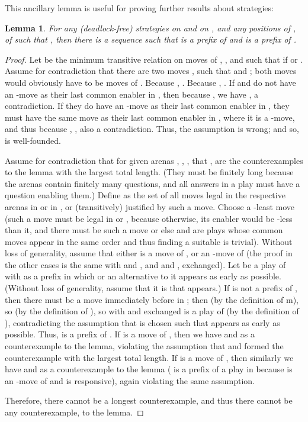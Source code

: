 \documentclass{article}
\newtheorem{lemma}[theorem]{Lemma}
\begin{document}
This ancillary lemma is useful for proving further results about strategies:
\begin{lemma}\label{lem:stratprefix}
  For any (deadlock-free) strategies  on  and  on , and any positions  of ,  of  such that ,  then there is a sequence  such that  is a prefix of  and  is a prefix of .
\end{lemma}
\begin{proof}
  Let  be the minimum transitive relation on moves of , , and  such that  if  or . Assume for contradiction that there are two moves ,  such that  and ; both moves would obviously have to be moves of . Because , . Because , . If  and  do not have an -move as their last common enabler in , then because , we have , a contradiction. If they do have an -move as their last common enabler in , they must have the same move as their last common enabler in , where it is a -move, and thus because , , also a contradiction. Thus, the assumption is wrong; and so,  is well-founded.

  Assume for contradiction that for given arenas , , , that ,  are the counterexamples to the lemma with the largest total length. (They must be finitely long because the arenas contain finitely many questions, and all answers in a play must have a question enabling them.) Define  as the set of all moves legal in the respective arenas in  or in , or (transitively) justified by such a move. Choose a -least move  (such a move must be legal in  or , because otherwise, its enabler would be -less than it, and there must be such a move or else  and  are plays whose common moves appear in the same order and thus finding a suitable  is trivial). Without loss of generality, assume that either  is a move of , or an -move of  (the proof in the other cases is the same with  and , and  and , exchanged). Let  be a play of  with  as a prefix in which  or an alternative to it appears as early as possible. (Without loss of generality, assume that it is  that appears.) If  is not a prefix of , then there must be a move  immediately before  in ; then  (by the definition of m), so  (by the definition of ), so  with  and  exchanged is a play of  (by the definition of ), contradicting the assumption that  is chosen such that  appears as early as possible. Thus,  is a prefix of . If  is a move of , then we have  and  as a counterexample to the lemma, violating the assumption that  and  formed the counterexample with the largest total length. If  is a move of , then similarly we have  and  as a counterexample to the lemma ( is a prefix of a play in  because  is an -move of  and  is responsive), again violating the same assumption.

  Therefore, there cannot be a longest counterexample, and thus there cannot be any counterexample, to the lemma.
\end{proof}
\end{document}
